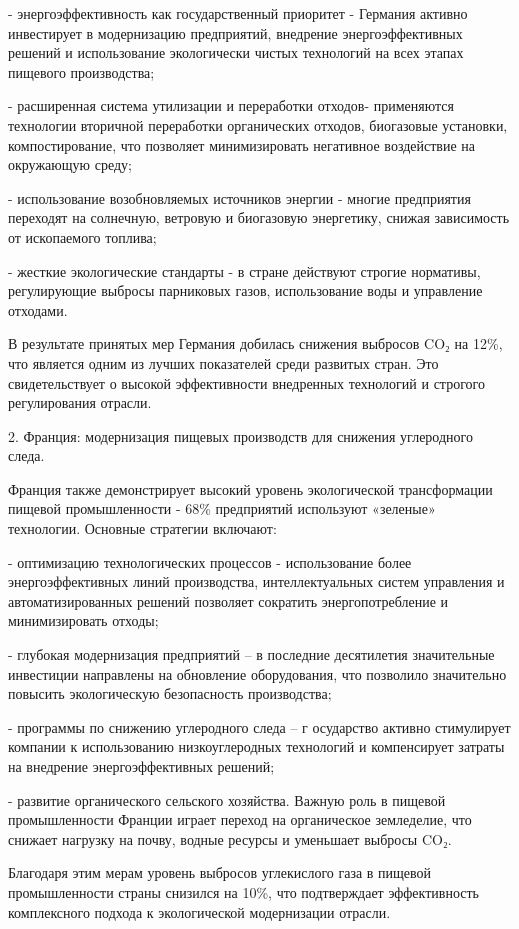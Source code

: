 - энергоэффективность как государственный приоритет - Германия активно
инвестирует в модернизацию предприятий, внедрение энергоэффективных
решений и использование экологически чистых технологий на всех этапах
пищевого производства;

- расширенная система утилизации и переработки отходов- применяются
технологии вторичной переработки органических отходов, биогазовые
установки, компостирование, что позволяет минимизировать негативное
воздействие на окружающую среду;

- использование возобновляемых источников энергии - многие предприятия
переходят на солнечную, ветровую и биогазовую энергетику, снижая
зависимость от ископаемого топлива;

- жесткие экологические стандарты - в стране действуют строгие
нормативы, регулирующие выбросы парниковых газов, использование воды и
управление отходами.

В результате принятых мер Германия добилась снижения выбросов CO₂ на
12\%, что является одним из лучших показателей среди развитых стран. Это
свидетельствует о высокой эффективности внедренных технологий и строгого
регулирования отрасли.

2. Франция: модернизация пищевых производств для снижения углеродного
следа.

Франция также демонстрирует высокий уровень экологической трансформации
пищевой промышленности - 68\% предприятий используют «зеленые»
технологии. Основные стратегии включают:

- оптимизацию технологических процессов - использование более
энергоэффективных линий производства, интеллектуальных систем управления
и автоматизированных решений позволяет сократить энергопотребление и
минимизировать отходы;

- глубокая модернизация предприятий -- в последние десятилетия
значительные инвестиции направлены на обновление оборудования, что
позволило значительно повысить экологическую безопасность производства;

- программы по снижению углеродного следа -- г осударство активно
стимулирует компании к использованию низкоуглеродных технологий и
компенсирует затраты на внедрение энергоэффективных решений;

- развитие органического сельского хозяйства. Важную роль в пищевой
промышленности Франции играет переход на органическое земледелие, что
снижает нагрузку на почву, водные ресурсы и уменьшает выбросы CO₂.

Благодаря этим мерам уровень выбросов углекислого газа в пищевой
промышленности страны снизился на 10\%, что подтверждает эффективность
комплексного подхода к экологической модернизации отрасли.


